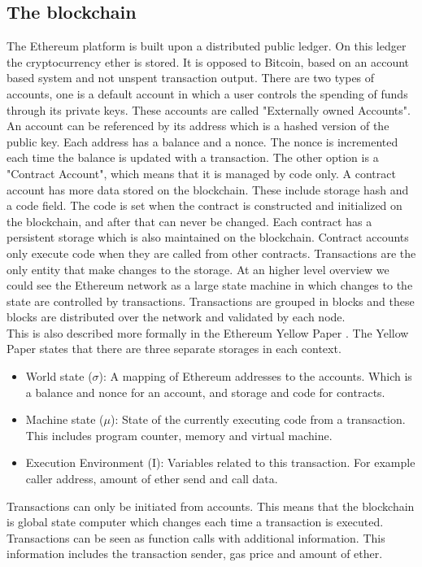 \documentclass[a4paper]{article}
\begin{document}
\subsection{The blockchain}
The Ethereum platform is built upon a distributed public ledger. On this ledger the cryptocurrency ether is stored. It is opposed to Bitcoin, based on an account based system and not unspent transaction output. There are two types of accounts, one is a default account in which a user controls the spending of funds through its private keys. These accounts are called "Externally owned Accounts". An account can be referenced by its address which is a hashed version of the public key. Each address has a balance and a nonce. The nonce is incremented each time the balance is updated with a transaction. The other option is a "Contract Account", which means that it is managed by code only. A contract account has more data stored on the blockchain. These include storage hash and a code field. The code is set when the contract is constructed and initialized on the blockchain, and after that can never be changed. Each contract has a persistent storage which is also maintained on the blockchain. Contract accounts only execute code when they are called from other contracts. Transactions are the only entity that make changes to the storage. At an higher level overview we could see the Ethereum network as a large state machine in which changes to the state are controlled by transactions. Transactions are grouped in blocks and these blocks are distributed over the network and validated by each node. \\
This is also described more formally in the Ethereum Yellow Paper \cite{wood2014ethereum}. The Yellow Paper states that there are three separate storages in each context.
\begin{itemize}
    \item World state ($\sigma$): A mapping of Ethereum addresses to the accounts. Which is a balance and nonce for an account, and storage and code for contracts.
    \item  Machine state ($\mu$): State of the currently executing code from a transaction. This includes program counter, memory and virtual machine.
    \item Execution Environment (I): Variables related to this transaction. For example caller address, amount of ether send and call data.
\end{itemize}
Transactions can only be initiated from accounts. This means that the blockchain is global state computer which changes each time a transaction is executed. Transactions can be seen as function calls with additional information. This information includes the transaction sender, gas price and amount of ether.\\
\end{document}
